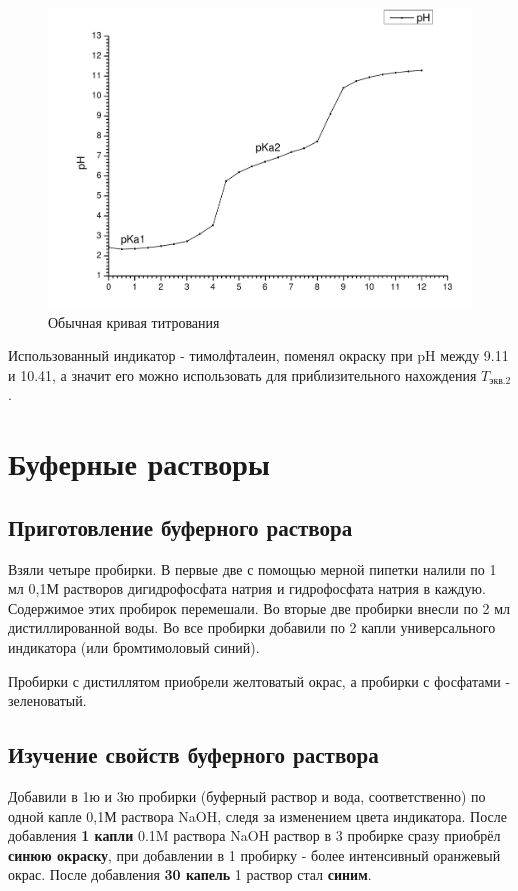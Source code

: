 \documentclass[a4paper,12pt]{article}
\begin{document}
\begin{figure}[H]

\centering

\includegraphics[scale=0.45]{common.pdf}

\caption{Обычная кривая титрования}

\label{fig:mpr}
\end{figure}
 Использованный индикатор - тимолфталеин, поменял окраску при pH между 9.11 и 10.41, а значит его можно использовать для приблизительного нахождения $T_{экв.2}$.
\section{Буферные растворы}
\subsection{Приготовление буферного раствора}
Взяли четыре пробирки. В первые две с помощью мерной пипетки налили по 1
мл 0,1М растворов дигидрофосфата натрия и гидрофосфата натрия в каждую.
Содержимое этих пробирок перемешали. Во вторые две пробирки внесли по 2 мл
дистиллированной воды. Во все пробирки добавили по 2 капли универсального
индикатора (или бромтимоловый синий).

Пробирки с дистиллятом приобрели желтоватый окрас, а пробирки с фосфатами - зеленоватый.
\subsection{Изучение свойств буферного раствора}
Добавили в 1ю и 3ю пробирки (буферный раствор и вода, соответственно) по
одной капле 0,1М раствора NaOH, следя за изменением цвета индикатора. 
После добавления \textbf{1 капли} 0.1M раствора NaOH раствор в 3 пробирке сразу приобрёл \textbf{синюю окраску}, при добавлении в 1 пробирку - более интенсивный оранжевый окрас. После добавления \textbf{30 капель} 1 раствор стал \textbf{синим}. 
\end{document}
